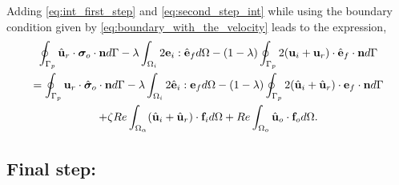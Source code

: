 Adding \ref{eq:int_first_step} and \ref{eq:second_step_int} while using the boundary condition given by \ref{eq:boundary_with_the_velocity} leads to the expression,
\begin{multline}
    \intS[p]{\hat{\textbf{u}}_{r} \cdot  \bm\sigma_{o}\cdot \textbf{n}}
    -\lambda \intO[i]{2\textbf{e}_i : \hat{\textbf{e}}_f}
    - (1-\lambda) \intS[p]{2(\textbf{u}_{i} + \textbf{u}_r)\cdot \hat{\textbf{e}}_f\cdot \textbf{n}}
    \\
    =
    \intS[p]{\textbf{u}_{r}\cdot \hat{\bm\sigma}_{o}\cdot \textbf{n}}
    - \lambda \intO[i]{2\hat{\textbf{e}}_i :\textbf{e}_f}
    - (1-\lambda) \intS[p]{2(\hat{\textbf{u}}_{i} + \hat{\textbf{u}}_r) \cdot  \textbf{e}_f \cdot \textbf{n}}
    \\ 
    + \zeta Re \intO{(\hat{\textbf{u}}_i+\hat{\textbf{u}}_r)\cdot \textbf{f}_{i}} 
    + Re\intO[o]{\hat{\textbf{u}}_{o}\cdot \textbf{f}_{o}}.
    \label{eq:int_third_step}
\end{multline}

\subsection{Final step:}

